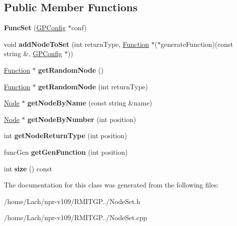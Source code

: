 \subsection*{Public Member Functions}
\begin{DoxyCompactItemize}
\item 
\hypertarget{classFuncSet_af38d587fdf20c058935cf7be826c4459}{}\label{classFuncSet_af38d587fdf20c058935cf7be826c4459} 
{\bfseries Func\+Set} (\hyperlink{classGPConfig}{G\+P\+Config} $\ast$conf)
\item 
\hypertarget{classFuncSet_a488cdd01ffacf8fe6d4081a56cf48285}{}\label{classFuncSet_a488cdd01ffacf8fe6d4081a56cf48285} 
void {\bfseries add\+Node\+To\+Set} (int return\+Type, \hyperlink{classFunction}{Function} $\ast$($\ast$generate\+Function)(const string \&, \hyperlink{classGPConfig}{G\+P\+Config} $\ast$))
\item 
\hypertarget{classFuncSet_a7ba39dff0e351c1b23dcd7de77065178}{}\label{classFuncSet_a7ba39dff0e351c1b23dcd7de77065178} 
\hyperlink{classFunction}{Function} $\ast$ {\bfseries get\+Random\+Node} ()
\item 
\hypertarget{classFuncSet_a56a52e61e2aeafea1bb012e4ab161307}{}\label{classFuncSet_a56a52e61e2aeafea1bb012e4ab161307} 
\hyperlink{classFunction}{Function} $\ast$ {\bfseries get\+Random\+Node} (int return\+Type)
\item 
\hypertarget{classFuncSet_a9b115eb0e18850a4ee8c81102eb7c491}{}\label{classFuncSet_a9b115eb0e18850a4ee8c81102eb7c491} 
\hyperlink{classNode}{Node} $\ast$ {\bfseries get\+Node\+By\+Name} (const string \&name)
\item 
\hypertarget{classFuncSet_adaa6674456af8906a05fa1e861e16cf4}{}\label{classFuncSet_adaa6674456af8906a05fa1e861e16cf4} 
\hyperlink{classNode}{Node} $\ast$ {\bfseries get\+Node\+By\+Number} (int position)
\item 
\hypertarget{classFuncSet_a3e346c9bed6d63bb77a4005f1cf90fc1}{}\label{classFuncSet_a3e346c9bed6d63bb77a4005f1cf90fc1} 
int {\bfseries get\+Node\+Return\+Type} (int position)
\item 
\hypertarget{classFuncSet_ac0e0a59155d2d9bf384b6094d8dde7d9}{}\label{classFuncSet_ac0e0a59155d2d9bf384b6094d8dde7d9} 
func\+Gen {\bfseries get\+Gen\+Function} (int position)
\item 
\hypertarget{classFuncSet_a018edfe8710687117b9f40619c867200}{}\label{classFuncSet_a018edfe8710687117b9f40619c867200} 
int {\bfseries size} () const
\end{DoxyCompactItemize}


The documentation for this class was generated from the following files\+:\begin{DoxyCompactItemize}
\item 
/home/\+Lach/npr-\/v109/\+R\+M\+I\+T\+G\+P../Node\+Set.\+h\item 
/home/\+Lach/npr-\/v109/\+R\+M\+I\+T\+G\+P../Node\+Set.\+cpp\end{DoxyCompactItemize}
